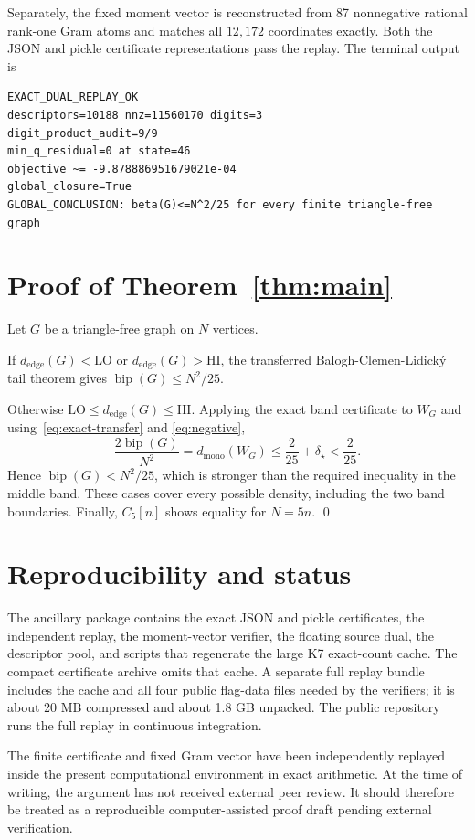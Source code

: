 \documentclass[11pt]{article}
\newcommand{\bip}{\operatorname{bip}}
\newcommand{\dmono}{d_{\mathrm{mono}}}
\newcommand{\dedge}{d_{\mathrm{edge}}}
\begin{document}
Separately, the fixed moment vector is reconstructed from 87 nonnegative
rational rank-one Gram atoms and matches all $12{,}172$ coordinates exactly.
Both the JSON and pickle certificate representations pass the replay.  The
terminal output is
\begin{verbatim}
EXACT_DUAL_REPLAY_OK
descriptors=10188 nnz=11560170 digits=3
digit_product_audit=9/9
min_q_residual=0 at state=46
objective ~= -9.878886951679021e-04
global_closure=True
GLOBAL_CONCLUSION: beta(G)<=N^2/25 for every finite triangle-free graph
\end{verbatim}

\section{Proof of Theorem~\ref{thm:main}}

Let $G$ be a triangle-free graph on $N$ vertices.

If $\dedge(G)<\mathrm{LO}$ or $\dedge(G)>\mathrm{HI}$, the transferred
Balogh-Clemen-Lidick\'y tail theorem gives $\bip(G)\le N^2/25$.

Otherwise $\mathrm{LO}\le\dedge(G)\le\mathrm{HI}$.  Applying the exact band
certificate to $W_G$ and using~\eqref{eq:exact-transfer} and
\eqref{eq:negative},
\[
  \frac{2\bip(G)}{N^2}=\dmono(W_G)
   \le\frac{2}{25}+\delta_\star
   <\frac{2}{25}.
\]
Hence $\bip(G)<N^2/25$, which is stronger than the required inequality in the
middle band.  These cases cover every possible density, including the two
band boundaries.  Finally, $C_5[n]$ shows equality for $N=5n$.
\qed

\section{Reproducibility and status}

The ancillary package contains the exact JSON and pickle certificates, the
independent replay, the moment-vector verifier, the floating source dual, the
descriptor pool, and scripts that regenerate the large K7 exact-count cache.
The compact certificate archive omits that cache.  A separate full replay
bundle includes the cache and all four public flag-data files needed by the
verifiers; it is about 20 MB compressed and about 1.8 GB unpacked.  The public
repository runs the full replay in continuous integration.

The finite certificate and fixed Gram vector have been independently replayed
inside the present computational environment in exact arithmetic.  At the
time of writing, the argument has not received external peer review.  It
should therefore be treated as a reproducible computer-assisted proof draft
pending external verification.
\end{document}
